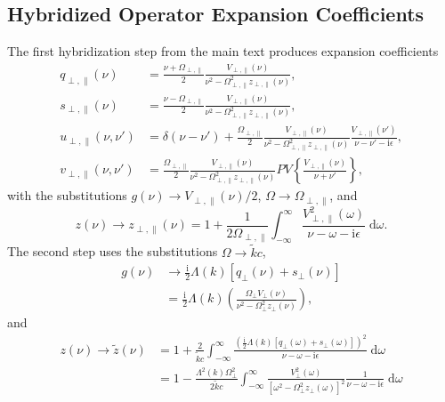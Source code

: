 \documentclass{article}
\begin{document}
\subsection{Hybridized Operator Expansion Coefficients}

The first hybridization step from the main text produces expansion coefficients
\begin{equation}
\begin{split}
q_{\perp,\parallel}(\nu) &= \frac{\nu + \Omega_{\perp,\parallel}}{2}\frac{V_{\perp,\parallel}(\nu)}{\nu^2 - \Omega_{\perp,\parallel}^2z_{\perp,\parallel}(\nu)},\\
s_{\perp,\parallel}(\nu) &= \frac{\nu - \Omega_{\perp,\parallel}}{2}\frac{V_{\perp,\parallel}(\nu)}{\nu^2 - \Omega_{\perp,\parallel}^2z_{\perp,\parallel}(\nu)},\\
u_{\perp,\parallel}(\nu,\nu') &= \delta(\nu - \nu') + \frac{\Omega_{\perp,\parallel}}{2}\frac{V_{\perp,\parallel}(\nu)}{\nu^2 - \Omega_{\perp,\parallel}^2z_{\perp,\parallel}(\nu)}\frac{V_{\perp,\parallel}(\nu')}{\nu - \nu' - \mathrm{i}\epsilon},\\
v_{\perp,\parallel}(\nu,\nu') &= \frac{\Omega_{\perp,\parallel}}{2}\frac{V_{\perp,\parallel}(\nu)}{\nu^2 - \Omega^2_{\perp,\parallel}z_{\perp,\parallel}(\nu)}PV\left\{\frac{V_{\perp,\parallel}(\nu)}{\nu + \nu'}\right\},
\end{split}
\end{equation}
with the substitutions $g(\nu)\to V_{\perp,\parallel}(\nu)/2$, $\Omega\to\Omega_{\perp,\parallel}$, and
\begin{equation}
z(\nu) \to z_{\perp,\parallel}(\nu) = 1 + \frac{1}{2\Omega_{\perp,\parallel}}\int_{-\infty}^\infty\frac{V_{\perp,\parallel}^2(\omega)}{\nu - \omega - \mathrm{i}\epsilon}\;\mathrm{d}\omega.
\end{equation}
The second step uses the substitutions $\Omega\to\tilde{k}c$,
\begin{equation}
\begin{split}
g(\nu)&\to\frac{\mathrm{i}}{2}\Lambda(k)\left[q_\perp(\nu) + s_\perp(\nu)\right]\\
&= \frac{\mathrm{i}}{2}\Lambda(k)\left(\frac{\Omega_\perp V_\perp(\nu)}{\nu^2 - \Omega_\perp^2z_\perp(\nu)}\right),
\end{split}
\end{equation}
and
\begin{equation}
\begin{split}
z(\nu)\to\tilde{z}(\nu) &= 1 + \frac{2}{\tilde{k}c}\int_{-\infty}^\infty\frac{\left(\frac{\mathrm{i}}{2}\Lambda(k)[q_\perp(\omega) + s_\perp(\omega)]\right)^2}{\nu - \omega - \mathrm{i}\epsilon}\;\mathrm{d}\omega\\
&= 1 - \frac{\Lambda^2(k)\Omega_\perp^2}{2\tilde{k}c}\int_{-\infty}^\infty\frac{V_\perp^2(\omega)}{[\omega^2 - \Omega_\perp^2z_\perp(\omega)]^2}\frac{1}{\nu - \omega - \mathrm{i}\epsilon}\;\mathrm{d}\omega
\end{split}
\end{equation}
\end{document}
